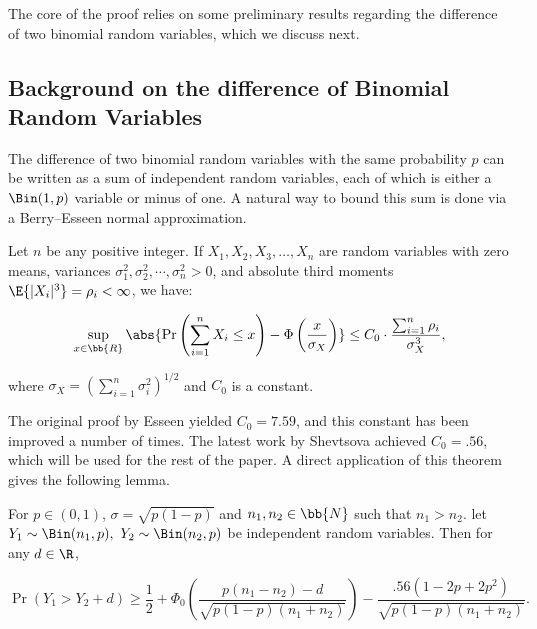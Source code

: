 \documentclass{toc}
\begin{document}
			The core of the proof relies on some preliminary results regarding the difference of two binomial random variables, which we discuss next.
			
			
			\subsection{Background on  %
				the  %
				difference of Binomial Random Variables}
			
			The difference of two binomial random variables with the same probability $p$ can be written as a sum of independent random variables, each of which is either a $\Bin(1, p)$ variable or minus of one. A natural way to bound this sum is done via a Berry--Esseen normal approximation.
			
			\begin{theorem} \label{thm:esseen}
				Let $n$ be any positive integer. If $X_1, X_2, X_3, \ldots, X_n$ are random variables with zero means, variances $\sigma_1^2, \sigma_2^2, \cdots, \sigma_n^2 > 0$, and absolute third moments $\E{|X_i|^3} = \rho_i < \infty$, we have:
				\begin{linenomath}\begin{equation*} \label{BE1}
						\sup_{x\in \bb{R}}\abs{\Pr\left( \sum_{i=1}^nX_i \le x \right) - \Phi\left(\frac{x}{\sigma_X}\right)} \le C_0\cdot\frac{\sum_{i=1}^n\rho_i}{\sigma_X^3},
				\end{equation*}\end{linenomath}
				where $\sigma_X = \left(\sum_{i=1}^n\sigma_i^2\right)^{1/2}$ and $C_0$ is a constant.
			\end{theorem}
			
			\noindent The original proof by Esseen \cite{esseen} yielded  $C_0 = 7.59$, and this constant has been improved a number of times. The latest work by Shevtsova \cite{shevtsova} achieved  $C_0 = .56$, which will be used for the rest of the paper. A direct application of this theorem gives the following lemma.
			
			\begin{lemma} \label{thm:diff of binom r.v. gen.}
				For $p\in (0, 1)$, $\sigma = \sqrt{p(1-p)}$ and $n_1, n_2 \in \bb{N}$ such that $n_1 > n_2$.
				let $Y_1 \sim \Bin(n_1, p), \ Y_2 \sim \Bin(n_2, p)$ be independent random variables.
				Then for any $d\in \R$,
				\begin{linenomath}\begin{equation*}
						\Pr\left(Y_1 > Y_2 + d\right) \ge \frac{1}{2} + \Phi_0\left(\frac{p(n_1 - n_2) - d}{\sqrt{p(1 - p)(n_1 + n_2)}}\right) - \frac{.56\left(1 - 2p + 2p^2\right)}{\sqrt{p(1 - p)(n_1 + n_2)}}.
				\end{equation*}\end{linenomath}
			\end{lemma}
			
\end{document}
